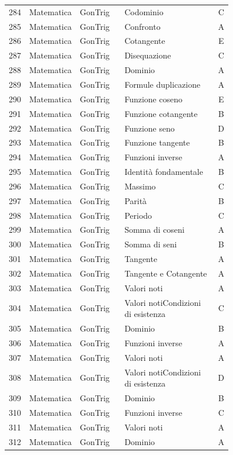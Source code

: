 \documentclass[20pt, a4paper]{article}
\begin{document}
\begin{longtable}{@{}r>{\raggedright\arraybackslash}p{0.14\linewidth}>{\raggedright\arraybackslash}p{0.20\linewidth}>{\raggedright\arraybackslash}p{0.42\linewidth}c@{}}
284 & Matematica & GonTrig & Codominio & C \\
285 & Matematica & GonTrig & Confronto & A \\
286 & Matematica & GonTrig & Cotangente & E \\
287 & Matematica & GonTrig & Disequazione & C \\
288 & Matematica & GonTrig & Dominio & A \\
289 & Matematica & GonTrig & Formule duplicazione & A \\
290 & Matematica & GonTrig & Funzione coseno & E \\
291 & Matematica & GonTrig & Funzione cotangente & B \\
292 & Matematica & GonTrig & Funzione seno & D \\
293 & Matematica & GonTrig & Funzione tangente & B \\
294 & Matematica & GonTrig & Funzioni inverse & A \\
295 & Matematica & GonTrig & Identità fondamentale & B \\
296 & Matematica & GonTrig & Massimo & C \\
297 & Matematica & GonTrig & Parità & B \\
298 & Matematica & GonTrig & Periodo & C \\
299 & Matematica & GonTrig & Somma di coseni & A \\
300 & Matematica & GonTrig & Somma di seni & B \\
301 & Matematica & GonTrig & Tangente & A \\
302 & Matematica & GonTrig & Tangente e Cotangente & A \\
303 & Matematica & GonTrig & Valori noti & A \\
304 & Matematica & GonTrig & Valori notiCondizioni di esistenza & C \\
305 & Matematica & GonTrig & Dominio & B \\
306 & Matematica & GonTrig & Funzioni inverse & A \\
307 & Matematica & GonTrig & Valori noti & A \\
308 & Matematica & GonTrig & Valori notiCondizioni di esistenza & D \\
309 & Matematica & GonTrig & Dominio & B \\
310 & Matematica & GonTrig & Funzioni inverse & C \\
311 & Matematica & GonTrig & Valori noti & A \\
312 & Matematica & GonTrig & Dominio & A \\

\end{longtable}
\end{document}

